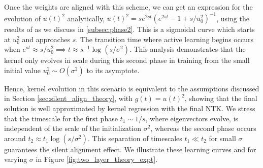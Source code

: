 \documentclass{article} %
\def\x{\bm x}
\newcommand{\cep}[1]{\textcolor{purple}{[Cengiz: #1]}}
\begin{document}
Once the weights are aligned with this scheme, we can get an expression for the evolution of $u(t)^2$ analytically, $u(t)^2 = s e^{2st} (e^{2st} - 1 + s / u_0^2)^{-1}$, using the results of \citep{fukumizu1998effect,Saxe14exactsolutions} as we discuss in \ref{subsec:phase2}. This is a sigmoidal curve which starts at $u_0^2$ and approaches $s$. The transition time where active learning begins occurs when $e^{st} \approx s/u_0^2 \implies t \approx s^{-1} \log( s/\sigma^2)$. This analysis demonstrates that the kernel only evolves in scale during this second phase in training from the small initial value $u_0^2 \sim O(\sigma^2)$ to its asymptote. 

Hence, kernel evolution in this scenario is equivalent to the assumptions discussed in Section \ref{sec:silent_align_theory}, with $g(t) = u(t)^2$, showing that the final solution is well approximated by kernel regression with the final NTK. We stress that the timescale for the first phase $t_1 \sim 1/s$, where eigenvectors evolve, is independent of the scale of the initialization $\sigma^2$, whereas the second phase occurs around $t_2 \approx t_1 \log(s/\sigma^2)$. This separation of timescales $t_1 \ll t_2$ for small $\sigma$ guarantees the silent alignment effect.   We illustrate these learning curves and for varying $\sigma$ in Figure \ref{fig:two_layer_theory_expt}.






\end{document}
